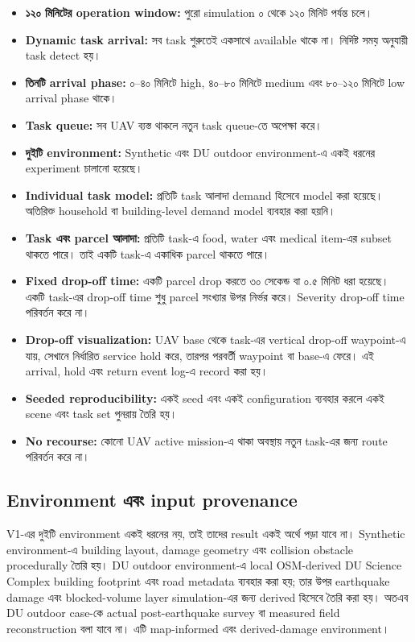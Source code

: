 \documentclass[10pt,a4paper]{article}
\begin{document}
\begin{itemize}
\item \textbf{১২০ মিনিটের operation window:} পুরো simulation ০ থেকে ১২০ মিনিট পর্যন্ত চলে।
\item \textbf{Dynamic task arrival:} সব task শুরুতেই একসাথে available থাকে না। নির্দিষ্ট সময় অনুযায়ী task detect হয়।
\item \textbf{তিনটি arrival phase:} ০--৪০ মিনিটে high, ৪০--৮০ মিনিটে medium এবং ৮০--১২০ মিনিটে low arrival phase থাকে।
\item \textbf{Task queue:} সব UAV ব্যস্ত থাকলে নতুন task queue-তে অপেক্ষা করে।
\item \textbf{দুইটি environment:} Synthetic এবং DU outdoor environment-এ একই ধরনের experiment চালানো হয়েছে।
\item \textbf{Individual task model:} প্রতিটি task আলাদা demand হিসেবে model করা হয়েছে। অতিরিক্ত household বা building-level demand model ব্যবহার করা হয়নি।
\item \textbf{Task এবং parcel আলাদা:} প্রতিটি task-এ food, water এবং medical item-এর subset থাকতে পারে। তাই একটি task-এ একাধিক parcel থাকতে পারে।
\item \textbf{Fixed drop-off time:} একটি parcel drop করতে ৩০ সেকেন্ড বা ০.৫ মিনিট ধরা হয়েছে। একটি task-এর drop-off time শুধু parcel সংখ্যার উপর নির্ভর করে। Severity drop-off time পরিবর্তন করে না।
\item \textbf{Drop-off visualization:} UAV base থেকে task-এর vertical drop-off waypoint-এ যায়, সেখানে নির্ধারিত service hold করে, তারপর পরবর্তী waypoint বা base-এ ফেরে। এই arrival, hold এবং return event log-এ record করা হয়।
\item \textbf{Seeded reproducibility:} একই seed এবং একই configuration ব্যবহার করলে একই scene এবং task set পুনরায় তৈরি হয়।
\item \textbf{No recourse:} কোনো UAV active mission-এ থাকা অবস্থায় নতুন task-এর জন্য route পরিবর্তন করে না।
\end{itemize}

\subsection{Environment এবং input provenance}

V1-এর দুইটি environment একই ধরনের নয়, তাই তাদের result একই অর্থে পড়া যাবে না।
Synthetic environment-এ building layout, damage geometry এবং collision obstacle
procedurally তৈরি হয়। DU outdoor environment-এ local OSM-derived DU Science
Complex building footprint এবং road metadata ব্যবহার করা হয়; তার উপর earthquake
damage এবং blocked-volume layer simulation-এর জন্য derived হিসেবে তৈরি করা হয়।
অতএব DU outdoor case-কে actual post-earthquake survey বা measured field
reconstruction বলা যাবে না। এটি map-informed এবং derived-damage environment।
\end{document}

